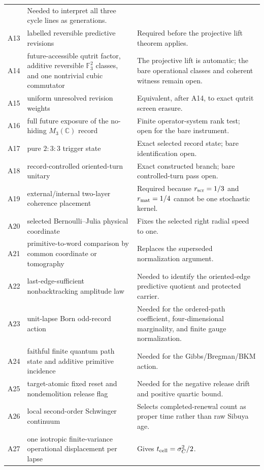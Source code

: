 \documentclass[11pt,oneside,openany]{book}
\numberwithin{equation}{chapter}
\theoremstyle{definition}
\theoremstyle{remark}
\newcommand{\C}{\mathbb C}
\begin{document}
\begin{longtable}{@{}p{}p{}p{}@{}}
& Needed to interpret all three cycle lines as generations.\\
A13
& labelled reversible predictive revisions
& Required before the projective lift theorem applies.\\
A14
& future-accessible qutrit factor, additive reversible \(\mathbb F_3^2\) classes, and one nontrivial cubic commutator
& The projective lift is automatic; the bare operational classes and coherent witness remain open.\\
A15
& uniform unresolved revision weights
& Equivalent, after A14, to exact qutrit screen erasure.\\
A16
& full future exposure of the no-hiding \(M_3(\C)\) record
& Finite operator-system rank test; open for the bare instrument.\\
A17
& pure \(2{:}3{:}3\) trigger state
& Exact selected record state; bare identification open.\\
A18
& record-controlled oriented-turn unitary
& Exact constructed branch; bare controlled-turn pass open.\\
A19
& external/internal two-layer coherence placement
& Required because \(r_{\rm scr}=1/3\) and \(r_{\rm mat}=1/4\) cannot be one
  stochastic kernel.\\
A20
& selected Bernoulli--Julia physical coordinate
& Fixes the selected right radial speed to one.\\
A21
& primitive-to-word comparison by common coordinate or tomography
& Replaces the superseded normalization argument.\\
A22
& last-edge-sufficient nonbacktracking amplitude law
& Needed to identify the oriented-edge predictive quotient and protected
  carrier.\\
A23
& unit-lapse Born odd-record action
& Needed for the ordered-path coefficient, four-dimensional marginality, and
  finite gauge normalization.\\
A24
& faithful finite quantum path state and additive primitive incidence
& Needed for the Gibbs/Bregman/BKM action.\\
A25
& target-atomic fixed reset and nondemolition release flag
& Needed for the negative release drift and positive quartic bound.\\
A26
& local second-order Schwinger continuum
& Selects completed-renewal count as proper time rather than raw Sibuya age.\\
A27
& one isotropic finite-variance operational displacement per lapse
& Gives \(t_{\rm cell}=\sigma_C^2/2\).\\

\end{longtable}
\end{document}
